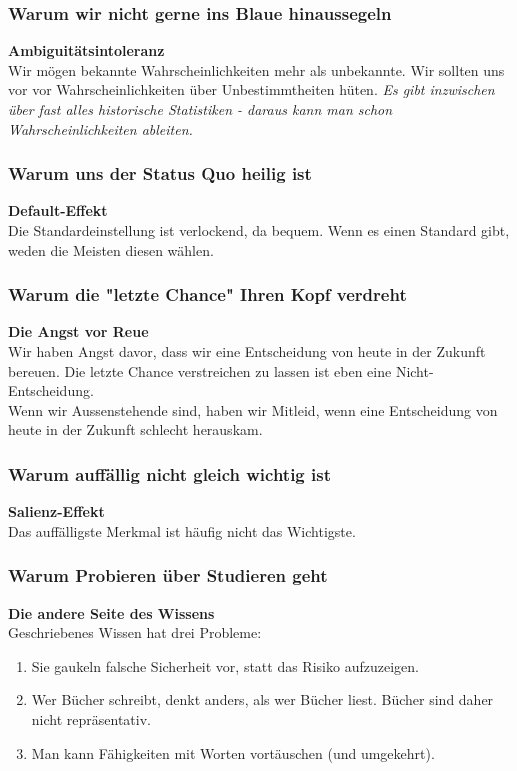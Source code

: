 \documentclass[a4paper, twocolumn]{article}
\begin{document}
\subsubsection*{Warum wir nicht gerne ins Blaue hinaussegeln}
\textbf{Ambiguitätsintoleranz} \\
Wir mögen bekannte Wahrscheinlichkeiten mehr als unbekannte. Wir sollten uns vor vor Wahrscheinlichkeiten über Unbestimmtheiten hüten.
\textit{Es gibt inzwischen über fast alles historische Statistiken - daraus kann man schon Wahrscheinlichkeiten ableiten.}

\subsubsection*{Warum uns der Status Quo heilig ist}
\textbf{Default-Effekt}\\
Die Standardeinstellung ist verlockend, da bequem. Wenn es einen Standard gibt, weden die Meisten diesen wählen.

\subsubsection*{Warum die "letzte Chance" Ihren Kopf verdreht}
\textbf{Die Angst vor Reue}\\
Wir haben Angst davor, dass wir eine Entscheidung von heute in der Zukunft bereuen. Die letzte Chance verstreichen zu lassen ist eben eine Nicht-Entscheidung.\\
Wenn wir Aussenstehende sind, haben wir Mitleid, wenn eine Entscheidung von heute in der Zukunft schlecht herauskam.

\subsubsection*{Warum auffällig nicht gleich wichtig ist}
\textbf{Salienz-Effekt}\\
Das auffälligste Merkmal ist häufig nicht das Wichtigste.

\subsubsection*{Warum Probieren über Studieren geht}
\textbf{Die andere Seite des Wissens}\\
Geschriebenes Wissen hat drei Probleme:
\begin{enumerate}
	\item Sie gaukeln falsche Sicherheit vor, statt das Risiko aufzuzeigen.
	\item Wer Bücher schreibt, denkt anders, als wer Bücher liest. Bücher sind daher nicht repräsentativ.
	\item Man kann Fähigkeiten mit Worten vortäuschen (und umgekehrt).
\end{enumerate}
\end{document}

